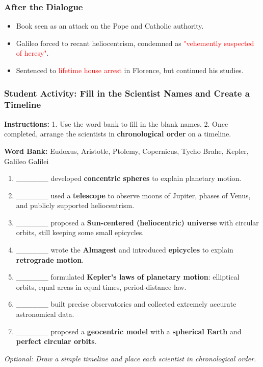 \documentclass[aspectratio=1611, 9pt]{beamer}
\begin{document}
\begin{frame}
  \frametitle{After the Dialogue}
  \begin{center}
    \begin{itemize}
      \item Book seen as an attack on the Pope and Catholic authority.
      \item Galileo forced to recant heliocentrism, condemned as \textcolor{red}{"vehemently suspected of heresy"}.
      \item Sentenced to \textcolor{red}{lifetime house arrest} in Florence, but continued his studies.
    \end{itemize}
  \end{center}
\end{frame}

\begin{frame}
\frametitle{Student Activity: Fill in the Scientist Names and Create a Timeline}

\textbf{Instructions:}  
1. Use the word bank to fill in the blank names.  
2. Once completed, arrange the scientists in \textbf{chronological order} on a timeline.

\vspace{0.3cm}

\textbf{Word Bank:} Eudoxus, Aristotle, Ptolemy, Copernicus, Tycho Brahe, Kepler, Galileo Galilei

\vspace{0.3cm}

\begin{enumerate}
    \item \_\_\_\_\_\_ developed \textbf{concentric spheres} to explain planetary motion.  
    \item \_\_\_\_\_\_ used a \textbf{telescope} to observe moons of Jupiter, phases of Venus, and publicly supported heliocentrism.  
    \item \_\_\_\_\_\_ proposed a \textbf{Sun-centered (heliocentric) universe} with circular orbits, still keeping some small epicycles.  
    \item \_\_\_\_\_\_ wrote the \textbf{Almagest} and introduced \textbf{epicycles} to explain \textbf{retrograde motion}.  
    \item \_\_\_\_\_\_ formulated \textbf{Kepler's laws of planetary motion}: elliptical orbits, equal areas in equal times, period-distance law.  
    \item \_\_\_\_\_\_ built precise observatories and collected extremely accurate astronomical data.  
    \item \_\_\_\_\_\_ proposed a \textbf{geocentric model} with a \textbf{spherical Earth} and \textbf{perfect circular orbits}.  
\end{enumerate}

\vspace{0.3cm}
\textit{Optional: Draw a simple timeline and place each scientist in chronological order.}

\end{frame}
\end{document}
